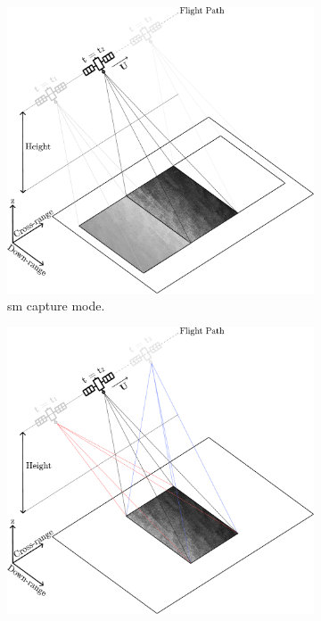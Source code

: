 \begin{figure} [htbp]
    \centering
    \begin{subfigure}{0.48\textwidth}
        \includegraphics[width=\textwidth]{Figures/Theory/stripmap.pdf}
        \caption{\acf{sm} capture mode.}
        \label{fig:theory.stripmap}
    \end{subfigure}   
    \begin{subfigure}{0.48\textwidth}
        \includegraphics[width=\textwidth]{Figures/Theory/spotlight.pdf}

\end{subfigure}
\end{figure}
